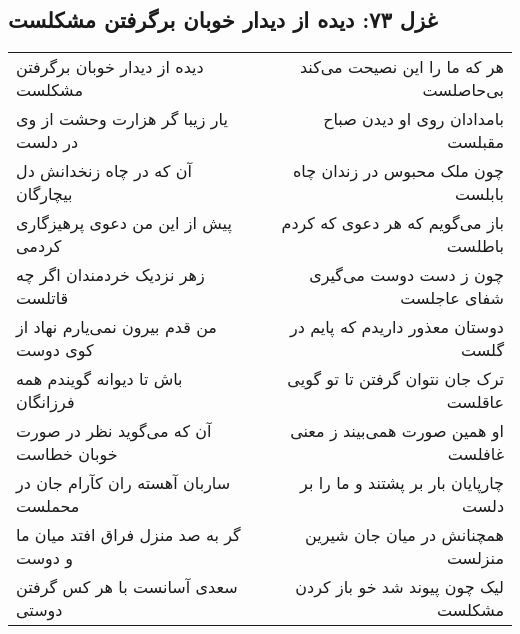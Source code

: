 \begin{center}
\section*{غزل ۷۳: دیده از دیدار خوبان برگرفتن مشکلست}
\label{sec:073}
\begin{longtable}{l p{0.5cm} r}
دیده از دیدار خوبان برگرفتن مشکلست
&&
هر که ما را این نصیحت می‌کند بی‌حاصلست
\\
یار زیبا گر هزارت وحشت از وی در دلست
&&
بامدادان روی او دیدن صباح مقبلست
\\
آن که در چاه زنخدانش دل بیچارگان
&&
چون ملک محبوس در زندان چاه بابلست
\\
پیش از این من دعوی پرهیزگاری کردمی
&&
باز می‌گویم که هر دعوی که کردم باطلست
\\
زهر نزدیک خردمندان اگر چه قاتلست
&&
چون ز دست دوست می‌گیری شفای عاجلست
\\
من قدم بیرون نمی‌یارم نهاد از کوی دوست
&&
دوستان معذور داریدم که پایم در گلست
\\
باش تا دیوانه گویندم همه فرزانگان
&&
ترک جان نتوان گرفتن تا تو گویی عاقلست
\\
آن که می‌گوید نظر در صورت خوبان خطاست
&&
او همین صورت همی‌بیند ز معنی غافلست
\\
ساربان آهسته ران کآرام جان در محملست
&&
چارپایان بار بر پشتند و ما را بر دلست
\\
گر به صد منزل فراق افتد میان ما و دوست
&&
همچنانش در میان جان شیرین منزلست
\\
سعدی آسانست با هر کس گرفتن دوستی
&&
لیک چون پیوند شد خو باز کردن مشکلست
\\
\end{longtable}
\end{center}
